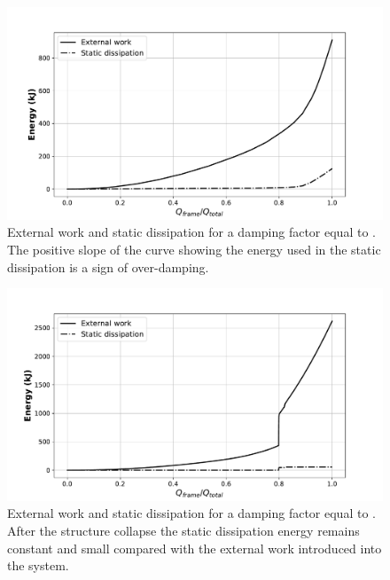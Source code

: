     \begin{figure}[!htpb]
      \centering
      \includegraphics[width=0.8 \textwidth]{figures/result-model/energy_damp-5}
      \caption[External work and static dissipation for a damping factor equal to ]{External work and static dissipation for a damping factor equal to . The positive slope of the curve showing the energy used in the static dissipation is a sign of over-damping.}\label{fig:energy_damp-5}
    \end{figure}

    \begin{figure}[!htpb]
      \centering
      \includegraphics[width=0.8 \textwidth]{figures/result-model/energy_damp-8}
      \caption[External work and static dissipation for a damping factor equal to ]{External work and static dissipation for a damping factor equal to . After the structure collapse the static dissipation energy remains constant and small compared with the external work introduced into the system.}\label{fig:energy_damp-8}
    \end{figure}

